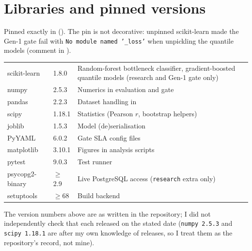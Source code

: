 \section{Libraries and pinned versions}
Pinned exactly in  (\evFILE). The pin is not decorative: unpinned scikit-learn made
the Gen-1 gate fail with \texttt{No module named '\_loss'} when unpickling the quantile models (comment in
).
\begin{center}\small
\begin{tabularx}{\textwidth}{@{}L{3.3cm}L{2.2cm}Y@{}}
\toprule {} &  & \\ \midrule
scikit-learn & 1.8.0 & Random-forest bottleneck classifier, gradient-boosted quantile models (research and Gen-1 gate only)\\
numpy & 2.5.3 & Numerics in evaluation and gate\\
pandas & 2.2.3 & Dataset handling in \\
scipy & 1.18.1 & Statistics (Pearson $r$, bootstrap helpers)\\
joblib & 1.5.3 & Model (de)serialisation\\
PyYAML & 6.0.2 & Gate SLA config files\\
matplotlib & 3.10.1 & Figures in analysis scripts\\
pytest & 9.0.3 & Test runner\\
psycopg2-binary & $\ge$2.9 & Live PostgreSQL access (\texttt{research} extra only)\\
setuptools & $\ge$68 & Build backend\\
\bottomrule
\end{tabularx}
\end{center}
The version numbers above are as written in the repository; I did not independently check that each
released on the stated date (\texttt{numpy 2.5.3} and \texttt{scipy 1.18.1} are after my own knowledge of
releases, so I treat them as the repository's record, not mine).

